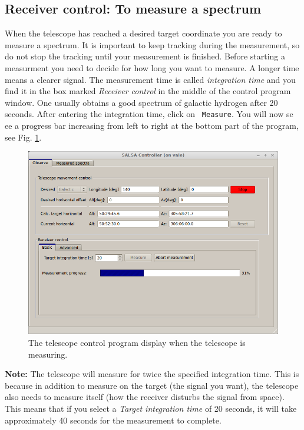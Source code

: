 \subsection{Receiver control: To measure a spectrum}
When the telescope has reached a desired target coordinate you are ready to
measure a spectrum. It is important to keep tracking during the measurement, so
do not stop the tracking until your measurement is finished.  Before starting a
measurment you need to decide for how long you want to measure. A longer time
means a clearer signal. The measurement time is called \emph{integration time}
and you find it in the box marked \emph{Receiver control} in the middle of the
control program window.  One usually obtains a good spectrum of galactic
hydrogen after 20 seconds.  After entering the integration time, click on {\tt
Measure}. You will now se ee a progress bar increasing from left to right at
the bottom part of the program, see Fig.
\ref{fig:controlmeasure}.
\begin{figure}[ht]
\begin{center}
\includegraphics[width=\textwidth]{../figures/Controller_measure.png}
\end{center}
\caption{The telescope control program display when the telescope is measuring.}
\label{fig:controlmeasure}
\end{figure}

{\bf Note:} The telescope will measure for twice the specified integration
time.  This is because in addition to measure on the target (the signal you
want), the telescope also needs to measure itself (how the receiver disturbs
the signal from space). This means that if you select a \emph{Target
integration time} of 20 seconds, it will take approximately 40 seconds for the
measurement to complete.  

